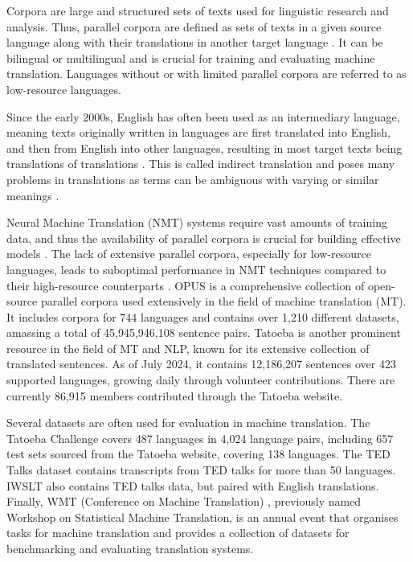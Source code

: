 \documentclass[a4paper, 11pt]{article}
\begin{document}
Corpora are large and structured sets of texts used for linguistic research and analysis. Thus, parallel corpora are defined as sets of texts in a given source language along with their translations in another target language \cite{lefer-2020-parallel-corpora}. It can be bilingual or multilingual and is crucial for training and evaluating machine translation. Languages without or with limited parallel corpora are referred to as low-resource languages.

Since the early 2000s, English has often been used as an intermediary language, meaning texts originally written in languages are first translated into English, and then from English into other languages, resulting in most target texts being translations of translations \cite{lefer-2020-parallel-corpora}. This is called indirect translation and poses many problems in translations as terms can be ambiguous with varying or similar meanings \cite{rosa-2017-indirect-translation-problems}.

Neural Machine Translation (NMT) systems require vast amounts of training data, and thus the availability of parallel corpora is crucial for building effective models \cite{koehn-2017-challenges}. The lack of extensive parallel corpora, especially for low-resource languages, leads to suboptimal performance in NMT techniques compared to their high-resource counterparts \cite{ranathunga-2023-nmt-low-res}. OPUS \cite{opus} is a comprehensive collection of open-source parallel corpora used extensively in the field of machine translation (MT). It includes corpora for 744 languages and contains over 1,210 different datasets, amassing a total of 45,945,946,108 sentence pairs. Tatoeba \cite{tatoeba} is another prominent resource in the field of MT and NLP, known for its extensive collection of translated sentences. As of July 2024, it contains 12,186,207 sentences over 423 supported languages, growing daily through volunteer contributions. There are currently
86,915 members contributed through the Tatoeba website.

Several datasets are often used for evaluation in machine translation. The Tatoeba Challenge \cite{tiedemann-2020-tatoeba-challenge} covers 487 languages in 4,024 language pairs, including 657 test sets sourced from the Tatoeba website, covering 138 languages. The TED Talks dataset \cite{ye-2018-word-embeddings-ted} contains transcripts from TED talks for more than 50 languages. IWSLT \cite{agarwal-iwstl-2023} also contains TED talks data, but paired with English translations. Finally, WMT (Conference on Machine Translation) \cite{barrault-2020-wmt}, previously named Workshop on Statistical Machine Translation, is an annual event that organises tasks for machine translation and provides a collection of datasets for benchmarking and evaluating translation systems.
\end{document}
